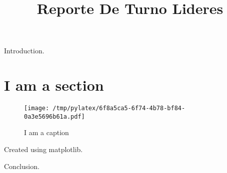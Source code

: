 \documentclass{article}%
\begin{document}
%
\normalsize%
\title{Reporte De Turno Lideres}%
Introduction.%
\section{I am a section}%
\label{sec:Iamasection}%


\begin{figure}[htbp]%
\centering%
\texttt{[image: /tmp/pylatex/6f8a5ca5-6f74-4b78-bf84-0a3e5696b61a.pdf]}%
\caption{I am a caption}%
\end{figure}

%
Created using matplotlib.

%
Conclusion.%
\end{document}

